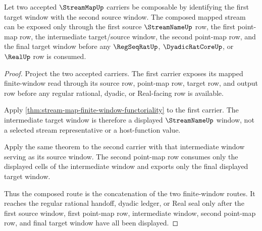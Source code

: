 \begin{theorem}
\label{thm:stream-map-composition-window-route}
Let two accepted $\StreamMapUp$ carriers be composable by identifying the first target window with the second source window. The composed mapped stream can be exposed only through the first source $\StreamNameUp$ row, the first point-map row, the intermediate target/source window, the second point-map row, and the final target window before any $\RegSeqRatUp$, $\DyadicRatCoreUp$, or $\RealUp$ row is consumed.
\end{theorem}
\begin{proof}
Project the two accepted carriers. The first carrier exposes its mapped finite-window read through its source row, point-map row, target row, and output row before any regular rational, dyadic, or Real-facing row is available.

Apply \autoref{thm:stream-map-finite-window-functoriality} to the first carrier. The intermediate target window is therefore a displayed $\StreamNameUp$ window, not a selected stream representative or a host-function value.

Apply the same theorem to the second carrier with that intermediate window serving as its source window. The second point-map row consumes only the displayed cells of the intermediate window and exports only the final displayed target window.

Thus the composed route is the concatenation of the two finite-window routes. It reaches the regular rational handoff, dyadic ledger, or Real seal only after the first source window, first point-map row, intermediate window, second point-map row, and final target window have all been displayed.
\end{proof}


